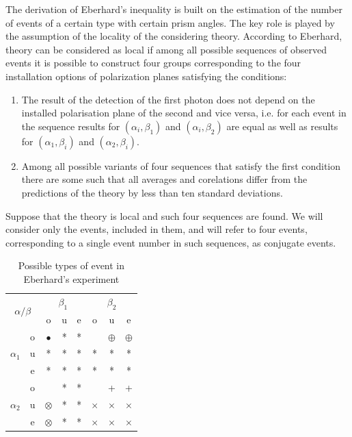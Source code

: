 \documentclass[%
master,         %
subf,           %
href,           %
colorlinks=true %
]{disser}
\numberwithin{equation}{section}
\numberwithin{figure}{section}
\begin{document}
The derivation of Eberhard's inequality is built on the estimation of the number of events of a certain type with certain prism angles. The key role is played by the assumption of the locality of the considering theory. According to Eberhard, theory can be considered as local if among all possible sequences of observed events it is possible to construct four groups corresponding to the four installation options of polarization planes satisfying the conditions:
\begin{enumerate}[label=(\roman*)]
\item The result of the detection of the first photon does not depend on the installed
polarisation plane of the second and vice versa, i.e. for each event in the sequence results for $(\alpha_i, \beta_1)$ and $(\alpha_i, \beta_2)$ are equal as well as results for $(\alpha_1, \beta_i)$ and $(\alpha_2, \beta_i)$.
\item  Among all possible variants of four sequences that satisfy the first condition there are some such that all averages and corelations differ from the predictions of the theory by less than ten standard deviations.
\end{enumerate}

Suppose that the theory is local and such four sequences are found. We will consider only the events, included in them, and will refer to four events, corresponding to a single event number in such sequences, as conjugate events.

\begin{table}
\centering
\begin{tabular}{|c|c|c|c|c|c|c|c|}
\hline 
\multicolumn{2}{|c|}{\multirow{2}{*}{$\alpha / \beta$}}  & \multicolumn{3}{c|}{$\beta_1$} & \multicolumn{3}{c|}{$\beta_2$} \\ 
\cline{3-8}
\multicolumn{2}{|c|}{}  & o & u & e & o & u & e \\ 
\hline 
\multirow{3}{*}{$\alpha_1$} & o & $\bullet$ & * & * &  & $\oplus$ & $\oplus$ \\ 
\cline{2-8}
 & u & * & * & * & * & * & * \\ 
\cline{2-8}
 & e & * & * & * & * & * & * \\ 
\hline 
\multirow{3}{*}{$\alpha_2$} & o &  & * & * &  & + & + \\ 
\cline{2-8}
 & u & $\otimes$ & * & * & $\times$ & $\times$ & $\times$ \\ 
\cline{2-8}
 & e & $\otimes$ & * & * & $\times$ & $\times$ & $\times$ \\ 
\hline 
\end{tabular} 
\caption{Possible types of event in Eberhard's experiment}
\label{tab:Eberhard_table}
\end{table}
\end{document}
